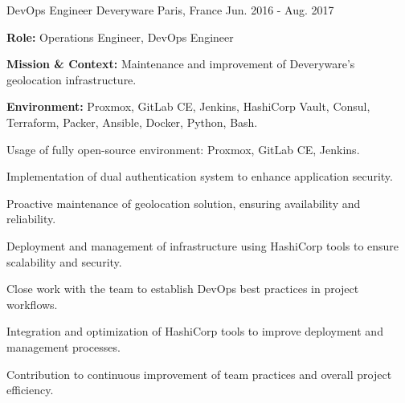 \begin{cventries}
\cventry
{DevOps Engineer} %
{Deveryware} %
{Paris, France} %
{Jun. 2016 - Aug. 2017} %
{
  \begin{cvitems} %
    \item {\textbf{Role:} Operations Engineer, DevOps Engineer}
    \item {\textbf{Mission \& Context:} Maintenance and improvement of Deveryware's geolocation infrastructure.}
    \item {\textbf{Environment:} Proxmox, GitLab CE, Jenkins, HashiCorp Vault, Consul, Terraform, Packer, Ansible, Docker, Python, Bash.}
    \item {Usage of fully open-source environment: Proxmox, GitLab CE, Jenkins.}
    \item {Implementation of dual authentication system to enhance application security.}
    \item {Proactive maintenance of geolocation solution, ensuring availability and reliability.}
    \item {Deployment and management of infrastructure using HashiCorp tools to ensure scalability and security.}
    \item {Close work with the team to establish DevOps best practices in project workflows.}
    \item {Integration and optimization of HashiCorp tools to improve deployment and management processes.}
    \item {Contribution to continuous improvement of team practices and overall project efficiency.}
  \end{cvitems}
}


\end{cventries}
